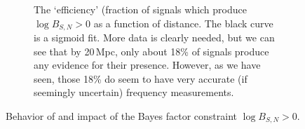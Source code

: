 \documentclass[showpacs, superscriptaddress, showpacs, letterpaper, showkeys,
preprintnumbers, altaffilletter, amssymb, amsmath, amsfonts, prd,
onecolumn, floatfix, nofootinbib]{revtex4-1}
\begin{document}
\begin{figure}
\begin{subfigure}{0.45\textwidth}
{}
\caption{The `efficiency' (fraction of signals which produce $\log B_{S,N}>0$ as
a function of distance.  The black curve is a sigmoid fit.  More data is clearly
needed, but we can see that by 20\,Mpc, only about 18\% of signals produce
any evidence for their presence.  However, as we have seen, those 18\% do seem
to have very accurate (if seemingly uncertain) frequency measurements.}
\end{subfigure}
\caption{Behavior of and impact of the Bayes factor constraint $\log B_{S,N}>0$.}
\end{figure}
\end{document}
